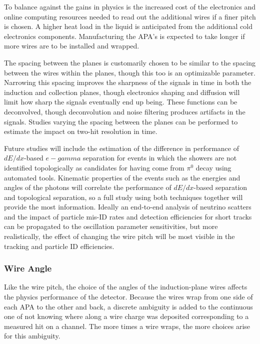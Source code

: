 To balance against the gains in physics is the increased cost of the
electronics and online computing resources needed to read out the
additional wires if a finer pitch is chosen.  A higher heat load in
the liquid is anticipated from the additional cold electronics
components.  Manufacturing the APA's is expected to take longer if
more wires are to be installed and wrapped.

The spacing between the planes is customarily chosen to be similar to
the spacing between the wires within the planes, though this too is an
optimizable parameter.  Narrowing this spacing improves the sharpness
of the signals in time in both the induction and collection planes,
though electronics shaping and diffusion will limit how sharp the
signals eventually end up being.  These functions can be deconvolved,
though deconvolution and noise filtering produces artifacts in the
signals.  Studies varying the spacing between the planes can be
performed to estimate the impact on two-hit resolution in time.

Future studies will include the estimation of the difference in
performance of $dE/dx$-based $e-gamma$ separation for events in which
the showers are not identified topologically as candidates for having
come from $\pi^0$ decay using automated tools.  Kinematic properties
of the events such as the energies and angles of the photons will
correlate the performance of $dE/dx$-based separation and topological
separation, so a full study using both techniques together will
provide the most information.  Ideally an end-to-end analysis of
neutrino scatters and the impact of particle mis-ID rates and
detection efficiencies for short tracks can be propagated to the
oscillation parameter sensitivities, but more realistically, the
effect of changing the wire pitch will be most visible in the tracking
and particle ID efficiencies.

\subsubsection{Wire Angle}

Like the wire pitch, the choice of the angles of the induction-plane
wires affects the physics performance of the detector.  Because the
wires wrap from one side of each APA to the other and back, a discrete
ambiguity is added to the continuous one of not knowing where along a
wire charge was deposited corresponding to a measured hit on a
channel.  The more times a wire wraps, the more choices arise for this
ambiguity.

